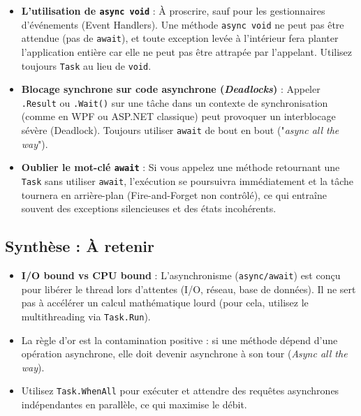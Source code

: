 \begin{tcolorbox}[colback=red!5!white,colframe=red!75!black,title=Pièges courants \& Erreurs de compilation]
\begin{itemize}
    \item \textbf{L'utilisation de \texttt{async void}} : À proscrire, sauf pour les gestionnaires d'événements (Event Handlers). Une méthode \texttt{async void} ne peut pas être attendue (pas de \texttt{await}), et toute exception levée à l'intérieur fera planter l'application entière car elle ne peut pas être attrapée par l'appelant. Utilisez toujours \texttt{Task} au lieu de \texttt{void}.
    \item \textbf{Blocage synchrone sur code asynchrone (\textit{Deadlocks})} : Appeler \texttt{.Result} ou \texttt{.Wait()} sur une tâche dans un contexte de synchronisation (comme en WPF ou ASP.NET classique) peut provoquer un interblocage sévère (Deadlock). Toujours utiliser \texttt{await} de bout en bout ("\textit{async all the way}").
    \item \textbf{Oublier le mot-clé \texttt{await}} : Si vous appelez une méthode retournant une \texttt{Task} sans utiliser \texttt{await}, l'exécution se poursuivra immédiatement et la tâche tournera en arrière-plan (Fire-and-Forget non contrôlé), ce qui entraîne souvent des exceptions silencieuses et des états incohérents.
\end{itemize}
\end{tcolorbox}

\subsection*{Synthèse : À retenir}
\begin{itemize}
    \item \textbf{I/O bound vs CPU bound} : L'asynchronisme (\texttt{async/await}) est conçu pour libérer le thread lors d'attentes (I/O, réseau, base de données). Il ne sert pas à accélérer un calcul mathématique lourd (pour cela, utilisez le multithreading via \texttt{Task.Run}).
    \item La règle d'or est la contamination positive : si une méthode dépend d'une opération asynchrone, elle doit devenir asynchrone à son tour (\textit{Async all the way}).
    \item Utilisez \texttt{Task.WhenAll} pour exécuter et attendre des requêtes asynchrones indépendantes en parallèle, ce qui maximise le débit.
\end{itemize}
